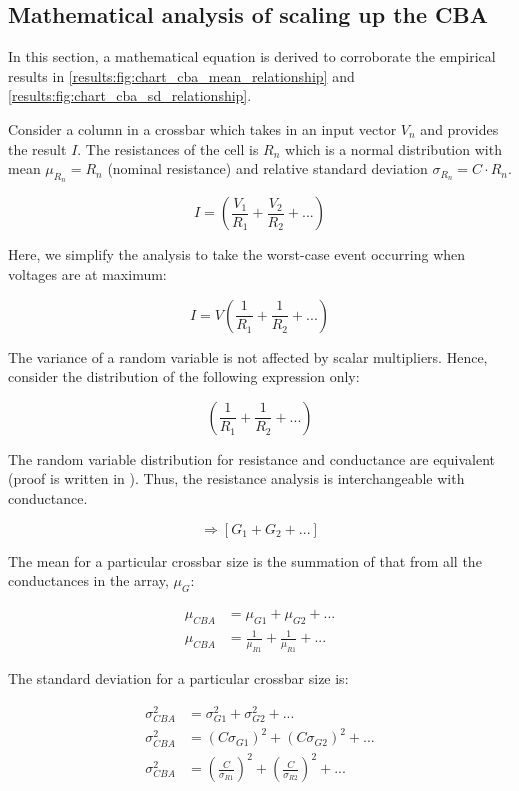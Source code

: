 \subsection{Mathematical analysis of scaling up the \ac{CBA}}

\noindent
In this section, a mathematical equation is derived to corroborate the empirical results in \autoref{results:fig:chart_cba_mean_relationship} and \autoref{results:fig:chart_cba_sd_relationship}.

\noindent
Consider a column in a crossbar which takes in an input vector $V_n$ and provides the result $I$. The resistances of the cell is $R_n$ which is a normal distribution with mean $\mu_{R_n} = R_n$ (nominal resistance) and relative standard deviation $\sigma_{R_n} = C\cdot R_n$.

$$
I = \left( \frac{V_1}{R_1} + \frac{V_2}{R_2} + ... \right)
$$

\noindent
Here, we simplify the analysis to take the worst-case event occurring when voltages are at maximum:

$$
I = V \left( \frac{1}{R_1} + \frac{1}{R_2} + ... \right)
$$

\noindent
The variance of a random variable is not affected by scalar multipliers. Hence, consider the distribution of the following expression only:

$$
\left( \frac{1}{R_1} + \frac{1}{R_2} + ... \right)
$$

\noindent
The random variable distribution for resistance and conductance are equivalent (proof is written in ). Thus, the resistance analysis is interchangeable with conductance.

$$
\Rightarrow \left[ G_1 + G_2 + ... \right]
$$

\noindent
The mean for a particular crossbar size is the summation of that from all the conductances in the array, $\mu_G$:

\begin{align*}
    \mu_{CBA} &= \mu_{G1} + \mu_{G2} + ... \\
    \mu_{CBA} &= \frac{1}{\mu_{R1}} + \frac{1}{\mu_{R1}} + ...
\end{align*}

\noindent
The standard deviation for a particular crossbar size is:

\begin{align*}
    \sigma_{CBA}^2 &= \sigma_{G1}^2 + \sigma_{G2}^2 + ... \\
    \sigma_{CBA}^2 &= (C\sigma_{G1})^2 + (C\sigma_{G2})^2 + ... \\
    \sigma_{CBA}^2 &= (\frac{C}{\sigma_{R1}})^2 + (\frac{C}{\sigma_{R2}})^2 + ...
\end{align*}

